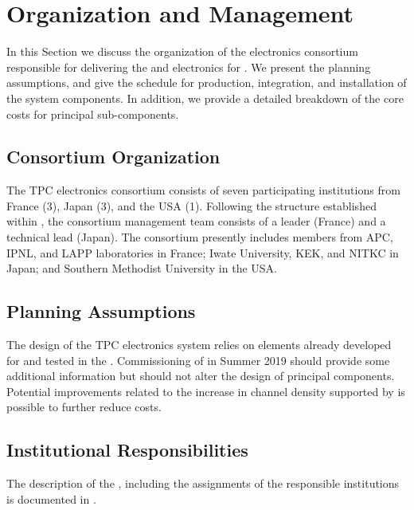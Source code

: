 \section{Organization and Management}
\label{sec:dp-tpcelec-org}
In this Section we discuss the organization of the   electronics consortium responsible for delivering the  and  electronics for . We present the planning assumptions, and give the schedule for production, integration, and installation of the system components. In addition, we provide a detailed breakdown of the core costs for principal sub-components. 


\subsection{Consortium Organization}
\label{ssec:dp-tpcelec-org-consortium}
The \dual TPC electronics consortium consists of seven participating institutions from France (\num{3}), Japan (\num{3}), and the USA (\num{1}). Following the structure established within , the consortium management team consists of a leader (France) and a technical lead (Japan). The consortium presently includes members from APC, IPNL, and LAPP laboratories in France; Iwate University, KEK, and NITKC in Japan; and Southern Methodist University in the USA. 

\subsection{Planning Assumptions}
\label{ssec:dp-tpcelec-org-assmp}
The design of the \dual TPC electronics system relies on elements already developed for  and tested in the .  Commissioning of  in Summer 2019 should provide some additional information but should not alter the design of principal components. Potential improvements related to the increase in channel density supported by   is possible to further reduce costs. 

\subsection{Institutional Responsibilities}
\label{ssec:dp-tpcelec-org-wbs}
The description of the , including the assignments of the responsible institutions is documented in .

